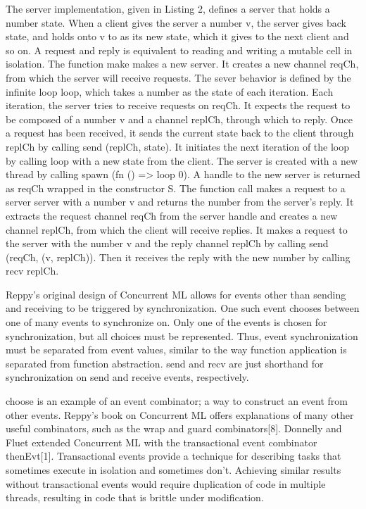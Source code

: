 The server implementation, given in Listing 2, defines a server that holds a number state.
When a client gives the server a number v, the server gives back state, and holds onto v to as
its new state, which it gives to the next client and so on.  A request and reply is equivalent
to reading and writing a mutable cell in isolation.  The function make makes a new server.  It
creates a new channel reqCh, from which the server will receive requests.  The sever behavior
is defined by the infinite loop loop, which takes a number as the state of each iteration.
Each iteration, the server tries to receive requests on reqCh.  It expects the request to be
composed of a number v and a channel replCh, through which to reply.  Once a request has been
received, it sends the current state back to the client through replCh by calling
send (replCh, state).  It initiates the next iteration of the loop by calling loop with a new
state from the client.  The server is created with a new thread by calling
spawn (fn () => loop 0).   A handle to the new server is returned as reqCh wrapped in the
constructor S.  The function call makes a request to a server server with a number v and
returns the number from the server's reply.  It extracts the request channel reqCh from the
server handle and creates a new channel replCh, from which the client will receive replies.
It makes a request to the server with the number v and the reply channel replCh by calling
send (reqCh, (v, replCh)).  Then it receives the reply with the new number by calling recv
replCh.

Reppy's original design of Concurrent ML allows for events other than sending and receiving to
be triggered by synchronization.  One such event chooses between one of many events to
synchronize on.  Only one of the events is chosen for synchronization, but all choices must be
represented.  Thus, event synchronization must be separated from event values, similar to the
way function application is separated from function abstraction.  send and recv are just
shorthand for synchronization on send and receive events, respectively.


choose is an example of an event combinator; a way to construct an event from other events.
Reppy's book on Concurrent ML offers explanations of many other useful combinators, such as the
wrap and guard combinators[8].  Donnelly and Fluet extended Concurrent ML with the
transactional event combinator thenEvt[1].  Transactional events provide a technique for
describing tasks that sometimes execute in isolation and sometimes don't.  Achieving similar
results without transactional events would require duplication of code in multiple threads,
resulting in code that is brittle under modification.

